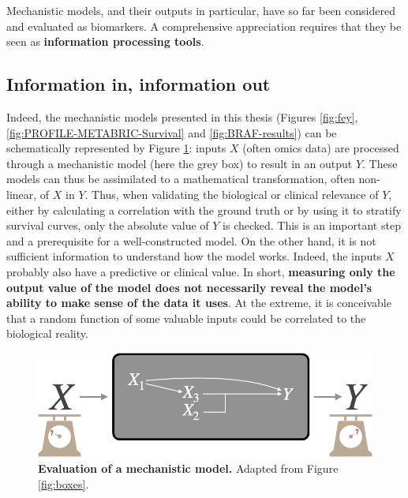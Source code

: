 \documentclass[a4paper,12pt,twoside,onecolumn,openright,final,oldfontcommands]{memoir}
\begin{document}
Mechanistic models, and their outputs in particular, have so far been
considered and evaluated as biomarkers. A comprehensive appreciation
requires that they be seen as \textbf{information processing tools}.

\subsection{Information in, information
out}\label{information-in-information-out}

Indeed, the mechanistic models presented in this thesis (Figures
\ref{fig:fey}, \ref{fig:PROFILE-METABRIC-Survival} and
\ref{fig:BRAF-results}) can be schematically represented by Figure
\ref{fig:box-mech}: inputs \(X\) (often omics data) are processed
through a mechanistic model (here the grey box) to result in an output
\(Y\). These models can thus be assimilated to a mathematical
transformation, often non-linear, of \(X\) in \(Y\). Thus, when
validating the biological or clinical relevance of \(Y\), either by
calculating a correlation with the ground truth or by using it to
stratify survival curves, only the absolute value of \(Y\) is checked.
This is an important step and a prerequisite for a well-constructed
model. On the other hand, it is not sufficient information to understand
how the model works. Indeed, the inputs \(X\) probably also have a
predictive or clinical value. In short, \textbf{measuring only the
output value of the model does not necessarily reveal the model's
ability to make sense of the data it uses}. At the extreme, it is
conceivable that a random function of some valuable inputs could be
correlated to the biological reality.

\begin{figure}

{\centering \includegraphics[width=0.8\linewidth]{fig/box-mech} 

}

\caption[Evaluation of a mechanistic model]{\textbf{Evaluation of a mechanistic model.}
Adapted from Figure \ref{fig:boxes}.}\label{fig:box-mech}
\end{figure}
\end{document}
